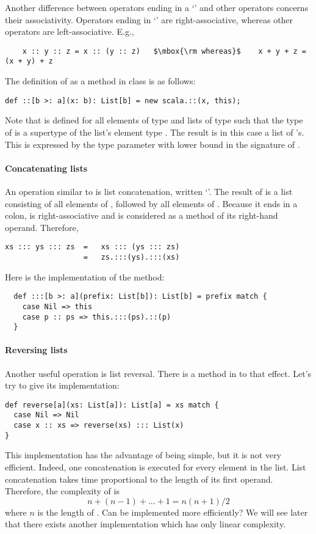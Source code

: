 \documentclass[a4paper,12pt,twoside,titlepage]{book}
\begin{document}
Another difference between operators ending in a `\code{:}' and other
operators concerns their associativity.  Operators ending in
`\code{:}' are right-associative, whereas other operators are
left-associative.  E.g.,
\begin{lstlisting}
    x :: y :: z = x :: (y :: z)   $\mbox{\rm whereas}$    x + y + z = (x + y) + z
\end{lstlisting}
The definition of \code{::} as a method in
class  is as follows:
\begin{lstlisting}
def ::[b >: a](x: b): List[b] = new scala.::(x, this);
\end{lstlisting}
Note that \code{::} is defined for all elements  of type
 and lists of type  such that the type 
of  is a supertype of the list's element type . The result
is in this case a list of 's. This
is expressed by the type parameter  with lower bound 
in the signature of \code{::}. 

\paragraph{Concatenating lists}
An operation similar to \code{::} is list concatenation, written
`\code{:::}'. The result of  is a list consisting of
all elements of , followed by all elements of .
Because it ends in a colon, \code{:::} is right-associative and is
considered as a method of its right-hand operand. Therefore,
\begin{lstlisting}
xs ::: ys ::: zs  =   xs ::: (ys ::: zs)
                  =   zs.:::(ys).:::(xs)
\end{lstlisting}
Here is the implementation of the \code{:::} method:
\begin{lstlisting}
  def :::[b >: a](prefix: List[b]): List[b] = prefix match {
    case Nil => this
    case p :: ps => this.:::(ps).::(p)
  }
\end{lstlisting}

\paragraph{Reversing lists} Another useful operation
is list reversal. There is a method  in  to
that effect. Let's try to give its implementation:
\begin{lstlisting}
def reverse[a](xs: List[a]): List[a] = xs match {
  case Nil => Nil
  case x :: xs => reverse(xs) ::: List(x)
}
\end{lstlisting}
This implementation has the advantage of being simple, but it is not
very efficient.  Indeed, one concatenation is executed for every
element in the list. List concatenation takes time proportional to the
length of its first operand. Therefore, the complexity of
 is
\[
n + (n - 1) + ... + 1 = n(n+1)/2
\]
where $n$ is the length of . Can  be
implemented more efficiently? We will see later that there exists
another implementation which has only linear complexity.
\end{document}
